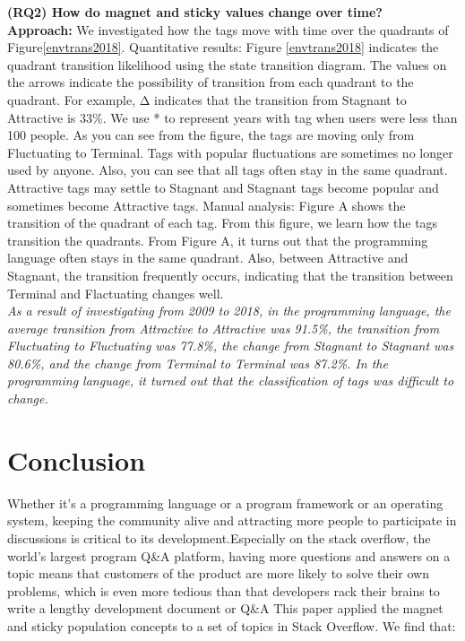 \documentclass[conference]{IEEEtran}
\begin{document}
\textbf{(RQ2) How do magnet and sticky values change over time?} \\
\textbf{Approach:}
We investigated how the tags move with time over the quadrants of Figure\ref{envtrans2018}. 
Quantitative results:
Figure \ref{envtrans2018} indicates the quadrant transition likelihood using the state transition diagram. The values on the arrows indicate the possibility of transition from each quadrant to the quadrant. For example, Δ indicates that the transition from Stagnant to Attractive is 33\%. We use * to represent years with tag when users were less than 100 people.
As you can see from the figure, the tags are moving only from Fluctuating to Terminal. Tags with popular fluctuations are sometimes no longer used by anyone. Also, you can see that all tags often stay in the same quadrant. Attractive tags may settle to Stagnant and Stagnant tags become popular and sometimes become Attractive tags. Manual analysis:
Figure A shows the transition of the quadrant of each tag. From this figure, we learn how the tags transition the quadrants.
From Figure A, it turns out that the programming language often stays in the same quadrant. Also, between Attractive and Stagnant, the transition frequently occurs, indicating that the transition between Terminal and Flactuating changes well.\\

\medskip
\emph{As a result of investigating from 2009 to 2018, in the programming language, the average transition from Attractive to Attractive was 91.5\%, the transition from Fluctuating to Fluctuating was 77.8\%, the change from Stagnant to Stagnant was 80.6\%, and the change from Terminal to Terminal was 87.2\%.  In the programming language, it turned out that the classification of tags was difficult to change.}
\medskip



\section{Conclusion}

Whether it's a programming language or a program framework or an operating system, keeping the community alive and attracting more people to participate in discussions is critical to its development.Especially on the stack overflow, the world's largest program Q\&A platform, having more questions and answers on a topic means that customers of the product are more likely to solve their own problems, which is even more tedious than that developers rack their brains to write a lengthy development document or Q\&A This paper applied the magnet and sticky population concepts to a set of topics in Stack Overflow. We find that:
\end{document}

